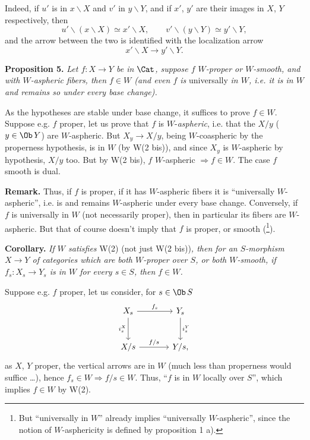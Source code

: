 Indeed, if $u'$ is in $x\backslash X$ and $v'$ in $y\backslash Y$, and if $x'$, $y'$ are their images in $X$, $Y$ respectively, then
\[
u'\backslash(x\backslash X)\simeq x'\backslash X,\qquad v'\backslash(y\backslash Y)\simeq y'\backslash Y,
\]
and the arrow between the two is identified with the localization arrow
\[
x'\backslash X\longrightarrow y'\backslash Y.
\]

\textbf{Proposition 5.} \textit{Let $f : X\longrightarrow Y$ be in $\Cat$, suppose $f$ $W$-proper or $W$-smooth, and with $W$-aspheric fibers, then $f\in W$ (and even $f$ is} \textup{universally} \textit{in $W$, i.e. it is in $W$ and remains so under every base change).}

\leavevmode{}As the hypotheses are stable under base change, it suffices to prove $f\in W$. Suppose e.g. $f$ proper, let us prove that $f$ is $W$-\textit{aspheric}, i.e. that the $X/y$ ($y\in\Ob\,Y$) are $W$-aspheric. But $X_y\longrightarrow X/y$, being $W$-coaspheric by the properness hypothesis, is in $W$ (by W(2 bis)), and since $X_y$ is $W$-aspheric by hypothesis, $X/y$ too. But by W(2 bis), $f$ $W$-aspheric $\Longrightarrow f\in W$. The case $f$ smooth is dual.

\textbf{Remark.} Thus, if $f$ is proper, if it has $W$-aspheric fibers it is ``universally $W$-aspheric'', i.e. is and remains $W$-aspheric under every base change. Conversely, if $f$ is universally in $W$ (not necessarily proper), then in particular its fibers are $W$-aspheric. But that of course doesn't imply that $f$ is proper, or smooth (\footnote[44]{But ``universally in $W$'' already implies ``universally $W$-aspheric'', since the notion of $W$-asphericity is defined by proposition 1 a).}).

\textbf{Corollary.} \textit{If $W$ satisfies} \textup{W(2) (not just W(2 bis))}\textit{, then for an $S$-morphism $X\longrightarrow Y$ of categories which are both $W$-proper over $S$, or both $W$-smooth, if $f_s : X_s\longrightarrow Y_s$ is in $W$ for every $s\in S$, then $f\in W$.}

\leavevmode{}Suppose e.g. $f$ proper, let us consider, for $s\in\Ob\,S$
\[
\begin{tikzcd}[row sep=large, column sep=large]
X_s \arrow[r, "f_s"] \arrow[d, "i_s^X"'] & Y_s \arrow[d, "i_s^Y"] \\
X/s \arrow[r, "f/s"] & Y/s,
\end{tikzcd}
\]
as $X$, $Y$ proper, the vertical arrows are in $W$ (much less than properness would suffice \dots), hence $f_s\in W\Longrightarrow f/s\in W$. Thus, ``$f$ is in $W$ locally over $S$'', which implies $f\in W$ by W(2).

